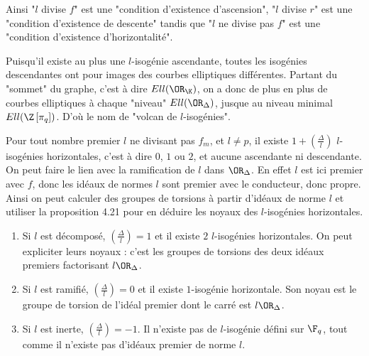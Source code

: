 \begin{Rem}
	Ainsi "$l$ divise $f$" est une "condition d'existence d'ascension", "$l$ divise $r$" est une "condition d'existence de descente" tandis que "$l$ ne divise pas $f$" est une "condition d'existence d'horizontalité". 
\end{Rem}

\begin{Rem}
	Puisqu'il existe au plus une $l$-isogénie ascendante, toutes les isogénies descendantes ont pour images des courbes elliptiques différentes. Partant du "sommet" du graphe, c'est à dire $Ell(\OR_{\K})$, on a donc de plus en plus de courbes elliptiques à chaque "niveau" $Ell(\OR_{\Delta})$, jusque au niveau minimal $Ell(\Z\left[ \pi_{q}\right] )$. D'où le nom de "volcan de $l$-isogénies".
\end{Rem}



\begin{Rem}
	Pour tout nombre premier $l$ ne divisant pas $f_{m}$, et $l\neq p$, il existe $1 + \left( \frac{\Delta}{l}\right)$ $l$-isogénies horizontales, c'est à dire $0$, $1$ ou $2$, et aucune ascendante ni descendante. On peut faire le lien avec la ramification de $l$ dans $\OR_{\Delta}$. En effet $l$ est ici premier avec $f$, donc les idéaux de normes $l$ sont premier avec le conducteur, donc propre. Ainsi on peut calculer des groupes de torsions à partir d'idéaux de norme $l$ et utiliser la proposition 4.21 pour en déduire les noyaux des $l$-isogénies horizontales. 
	\begin{enumerate}
		\item Si $l$ est décomposé, $\left( \frac{\Delta}{l}\right) = 1$ et il existe $2$ $l$-isogénies horizontales. On peut expliciter leurs noyaux : c'est les groupes de torsions des deux idéaux premiers factorisant $l\OR_{\Delta}$.
		
		\item Si $l$ est ramifié, $\left( \frac{\Delta}{l}\right) = 0$ et il existe $1$-isogénie horizontale. Son noyau est le groupe de torsion de l'idéal premier dont le carré est $l\OR_{\Delta}$.
		
		\item Si $l$ est inerte, $\left( \frac{\Delta}{l}\right) = -1$. Il n'existe pas de $l$-isogénie défini sur $\F_{q}$, tout comme il n'existe pas d'idéaux premier de norme $l$.
	\end{enumerate}
\end{Rem}